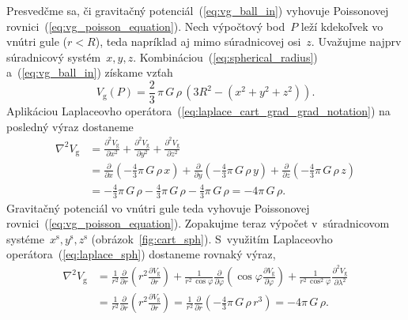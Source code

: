 \documentclass[a4paper, 12pt]{book}
\newcommand{\gidx}{\mathrm g}
\begin{document}
Presvedčme sa, či gravitačný potenciál~(\ref{eq:vg_ball_in}) vyhovuje 
Poissonovej rovnici~(\ref{eq:vg_poisson_equation}).  Nech výpočtový bod~$P$ 
leží kdekoľvek vo vnútri gule ($r < R$), teda napríklad aj mimo súradnicovej 
osi~$z$.  Uvažujme najprv súradnicový systém~$x, y, z$.  
Kombináciou~(\ref{eq:spherical_radius}) a~(\ref{eq:vg_ball_in}) získame vzťah
%
\begin{equation}
V_\gidx(P) = \frac{2}{3} \, \pi \, G \, \rho \, \left(3 R^2 - (x^2 + y^2 
+ z^2)\right){.}
\end{equation}
%
Aplikáciou Laplaceovho operátora~(\ref{eq:laplace_cart_grad_grad_notation}) na 
posledný výraz dostaneme
%
\begin{equation}
\label{eq:vg_homogeneous_ball_poisson}
\begin{split}
\nabla^2 V_\gidx &= \frac{\partial^2 V_\gidx}{\partial x^2} + \frac{\partial^2 
V_\gidx}{\partial y^2} + \frac{\partial^2 V_\gidx}{\partial z^2}\\
%
&= \frac{\partial}{\partial x} \left( -\frac{4}{3} \pi \, G \, \rho \, 
x \right) + \frac{\partial}{\partial y} \left( -\frac{4}{3} \pi \, G \, \rho \, 
y \right) + \frac{\partial}{\partial z} \left( -\frac{4}{3} \pi \, G \, \rho \, 
z \right)\\
%
&= -\frac{4}{3} \pi \, G \, \rho - \frac{4}{3} \pi \, G \, \rho - \frac{4}{3} 
\pi \, G \, \rho = -4 \pi \, G \, \rho{.}
\end{split}
\end{equation}
%
Gravitačný potenciál vo vnútri gule teda vyhovuje Poissonovej 
rovnici~(\ref{eq:vg_poisson_equation}).  Zopakujme teraz výpočet v~súradnicovom 
systéme~$x^\mathrm{s}, y^\mathrm{s}, z^\mathrm{s}$ 
(obrázok~\ref{fig:cart_sph}).  S~využitím Laplaceovho 
operátora~(\ref{eq:laplace_sph}) dostaneme rovnaký výraz,
%
\begin{equation}
\begin{split}
\nabla^2 V_\gidx &= \frac{1}{r^2} \frac{\partial}{\partial r} \left( r^2 
\frac{\partial V_\gidx}{\partial r} \right) + \frac{1}{r^2 \, \cos\varphi} 
\frac{\partial}{\partial \varphi} \left( \cos\varphi \frac{\partial 
V_\gidx}{\partial \varphi} \right) + \frac{1}{r^2 \, 
\cos^2\varphi}\frac{\partial^2 V_\gidx}{\partial \lambda^2}\\
%
&= \frac{1}{r^2} \frac{\partial}{\partial r} \left( r^2 \frac{\partial 
V_\gidx}{\partial r} \right) = \frac{1}{r^2} \frac{\partial}{\partial r} \left( 
-\frac{4}{3} \pi \, G \, \rho \, r^3 \right) = -4 \pi \, G \, \rho{.}
\end{split}
\end{equation}
\end{document}
